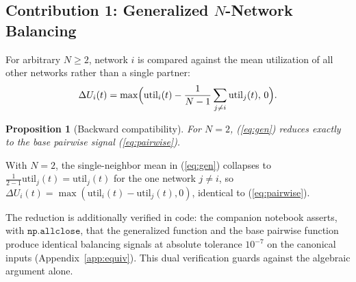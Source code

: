 \documentclass[10pt,journal]{IEEEtran}
\newtheorem{proposition}{Proposition}[section]
\newcommand{\D}{\Delta}
\newcommand{\util}{\mathrm{util}}
\begin{document}
\subsection{Contribution 1: Generalized $N$-Network Balancing}\label{sec:gen}
For arbitrary $N\ge2$, network $i$ is compared against the mean utilization
of all other networks rather than a single partner:
\begin{equation}\label{eq:gen}
  \D U_i(t)=\max\Bigl(\util_i(t)-\frac{1}{N-1}\sum_{j\ne i}\util_j(t),\,
    0\Bigr).
\end{equation}

\begin{proposition}[Backward compatibility]\label{prop:n2}
For $N=2$, (\ref{eq:gen}) reduces exactly to the base pairwise signal
(\ref{eq:pairwise}).
\end{proposition}
\begin{IEEEproof}
With $N=2$, the single-neighbor mean in (\ref{eq:gen}) collapses to
$\tfrac{1}{2-1}\util_j(t)=\util_j(t)$ for the one network $j\ne i$, so
$\D U_i(t)=\max(\util_i(t)-\util_j(t),0)$, identical to
(\ref{eq:pairwise}).
\end{IEEEproof}

The reduction is additionally verified in code: the companion notebook
asserts, with $\texttt{np.allclose}$, that the generalized function and the
base pairwise function produce identical balancing signals at absolute
tolerance $10^{-7}$ on the canonical inputs (Appendix~\ref{app:equiv}).
This dual verification guards against the algebraic argument alone.
\end{document}
